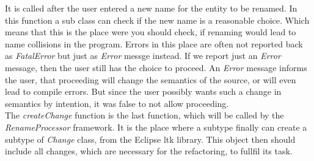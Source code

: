 \documentclass[a4paper,10pt]{report}
\begin{document}
It is called after the user entered a new name for the entity to be renamed.
In this function a sub class can check if the new name is a reasonable choice.
Which means that this is the place were you should check, if renaming would lead to name collisions in the program.
Errors in this place are often not reported back as {\it FatalError} but just as {\it Error} messge instead.
If we report just an {\it Error} message, then the user still has the choice to  proceed. An {\it Error} message informs the user, that proceeding
will change the semantics of the source, or will even lead to compile errors. But since the user possibly wants such a change in semantics by intention, it was false to not allow proceeding.\\
The {\it createChange} function is the last function, which will be called by the {\it RenameProcessor} framework. It is the place where a subtype finally can create a subtype of {\it Change} class, from the Eclipse ltk library.
This object then should include all changes, which are necessary for the refactoring, to fullfil its task.


\renewcommand{\nomname}{Glossary}
\printnomenclature
\end{document}
